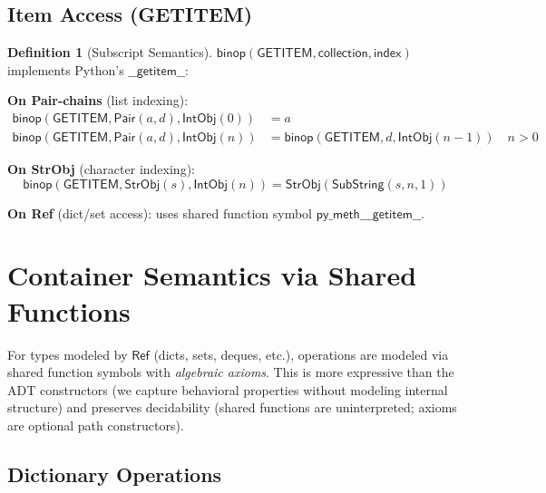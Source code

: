 \documentclass[11pt,a4paper]{report}
\theoremstyle{definition}
\newtheorem{definition}{Definition}[chapter]
\theoremstyle{plain}
\begin{document}
\subsection{Item Access (GETITEM)}

\begin{definition}[Subscript Semantics]
$\mathsf{binop}(\mathsf{GETITEM}, \mathsf{collection}, \mathsf{index})$
implements Python's $\mathsf{\_\_getitem\_\_}$:

\textbf{On Pair-chains} (list indexing):
\begin{align}
  \mathsf{binop}(\mathsf{GETITEM}, \mathsf{Pair}(a, d),
    \mathsf{IntObj}(0)) &= a \\
  \mathsf{binop}(\mathsf{GETITEM}, \mathsf{Pair}(a, d),
    \mathsf{IntObj}(n)) &= \mathsf{binop}(\mathsf{GETITEM}, d,
    \mathsf{IntObj}(n-1)) \quad n > 0
\end{align}

\textbf{On StrObj} (character indexing):
\[
  \mathsf{binop}(\mathsf{GETITEM}, \mathsf{StrObj}(s),
    \mathsf{IntObj}(n)) = \mathsf{StrObj}(\mathsf{SubString}(s, n, 1))
\]

\textbf{On Ref} (dict/set access): uses shared function symbol
$\mathsf{py\_meth\_\_\_getitem\_\_}$.
\end{definition}


\section{Container Semantics via Shared Functions}

For types modeled by $\mathsf{Ref}$ (dicts, sets, deques, etc.),
operations are modeled via shared function symbols with
\emph{algebraic axioms}.  This is more expressive than the ADT
constructors (we capture behavioral properties without modeling
internal structure) and preserves decidability (shared functions
are uninterpreted; axioms are optional path constructors).

\subsection{Dictionary Operations}
\end{document}
